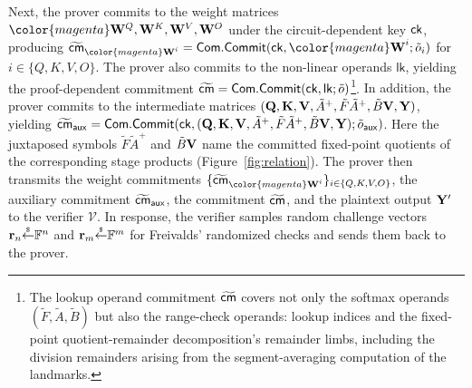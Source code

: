 \documentclass[sigconf,anonymous,review,balance=false]{acmart}
\newcommand{\rev}[1]{{\color{magenta}#1}}
\begin{document}
Next, the prover commits to the weight matrices $\rev{\W^Q, \W^K, \W^V, \W^O}$ under the circuit-dependent key ${\sf ck}$, producing $\widetilde{\cm}_{\rev{\W}^i} = \Com.\commit(\ck, \rev{\W}^i; \tilde{o}_i)$ for $i \in \{Q,K,V,O\}$.
The prover also commits to the non-linear operands $\mathsf{lk}$, yielding the proof-dependent commitment $\widetilde{{\sf cm}} = {\sf Com}.{\sf Commit}({\sf ck}, \mathsf{lk}; \tilde{o})$\rev{\footnote{\label{fn:lkp-scope}\rev{The lookup operand commitment $\widetilde{{\sf cm}}$ covers not only the softmax operands $(\tilde{F},\tilde{A},\tilde{B})$ but also the range-check operands: lookup indices and the fixed-point quotient-remainder decomposition's remainder limbs\rev{, including the division remainders arising from the segment-averaging computation of the landmarks}.}}}.
\rev{In addition, the prover commits to the intermediate matrices $({\mathbf{Q}}, {\mathbf{K}}, {\mathbf{V}}, \tilde{A}^{+}, \tilde{F}\tilde{A}^{+}, \tilde{B}{\mathbf{V}}, {\mathbf{Y}})$, yielding $\widetilde{{\sf cm}}_{\mathsf{aux}} = {\sf Com}.{\sf Commit}({\sf ck}, ({\mathbf{Q}},{\mathbf{K}},{\mathbf{V}},\tilde{A}^{+},\tilde{F}\tilde{A}^{+},\tilde{B}{\mathbf{V}},{\mathbf{Y}}); \tilde{o}_{\mathsf{aux}})$. Here the juxtaposed symbols $\tilde{F}\tilde{A}^{+}$ and $\tilde{B}{\mathbf{V}}$ name the committed fixed-point quotients of the corresponding stage products (Figure~\ref{fig:relation}).}
The prover then transmits the weight commitments $\{\widetilde{\cm}_{\rev{\W}^i}\}_{i \in \{Q,K,V,O\}}$, \rev{the auxiliary commitment $\widetilde{{\sf cm}}_{\mathsf{aux}}$,} the commitment $\widetilde{{\sf cm}}$, and the plaintext output ${\mathbf{Y}}'$ to the verifier $\mathcal{V}$.
In response, the verifier samples random challenge vectors ${\mathbf{r}}_n {\overset{{\scriptscriptstyle\$}}{\leftarrow}} \mathbb{F}^n$ and ${\mathbf{r}}_m {\overset{{\scriptscriptstyle\$}}{\leftarrow}} \mathbb{F}^m$ for Freivalds' randomized checks and sends them back to the prover.
\end{document}
